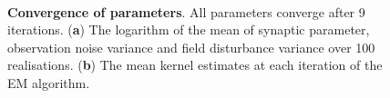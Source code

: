 \documentclass[]{article}
\begin{document}
\begin{figure}[!ht]
\centering
\\
\centering
{}
\caption{{\bf Convergence of parameters}. All parameters converge after 9 iterations. (\textbf a) The logarithm of the mean of synaptic parameter, observation noise variance and field disturbance variance over 100 realisations. (\textbf b) The mean kernel estimates at each iteration of the EM algorithm.}
\label{fig:ParameterConvergence}
\end{figure}

\clearpage
\newpage
\appendix
\end{document}
